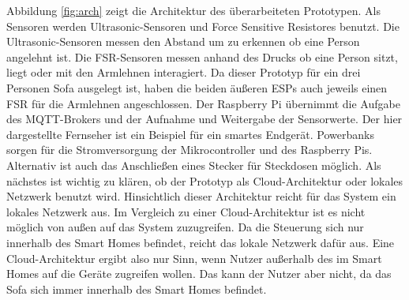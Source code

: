 Abbildung \ref{fig:arch} zeigt die Architektur des überarbeiteten Prototypen. Als Sensoren werden Ultrasonic-Sensoren und Force Sensitive Resistores benutzt. Die Ultrasonic-Sensoren messen den Abstand um zu erkennen ob eine Person angelehnt ist. Die FSR-Sensoren messen anhand des Drucks ob eine Person sitzt, liegt oder mit den Armlehnen interagiert. Da dieser Prototyp für ein drei Personen Sofa ausgelegt ist, haben die beiden äußeren ESPs auch jeweils einen FSR für die Armlehnen angeschlossen. Der Raspberry Pi übernimmt die Aufgabe des MQTT-Brokers und der Aufnahme und Weitergabe der Sensorwerte. Der hier dargestellte Fernseher ist ein Beispiel für ein smartes Endgerät. Powerbanks sorgen für die Stromversorgung der Mikrocontroller und des Raspberry Pis. Alternativ ist auch das Anschließen eines Stecker für Steckdosen möglich. Als nächstes ist wichtig zu klären, ob der Prototyp als Cloud-Architektur oder lokales Netzwerk benutzt wird.
\newline
Hinsichtlich dieser Architektur reicht für das System ein lokales Netzwerk aus. Im Vergleich zu einer Cloud-Architektur ist es nicht möglich von außen auf das System zuzugreifen. Da die Steuerung sich nur innerhalb des Smart Homes befindet, reicht das lokale Netzwerk dafür aus. Eine Cloud-Architektur ergibt also nur Sinn, wenn Nutzer außerhalb des im Smart Homes auf die Geräte zugreifen wollen. Das kann der Nutzer aber nicht, da das Sofa sich immer innerhalb des Smart Homes befindet. 

\newpage

